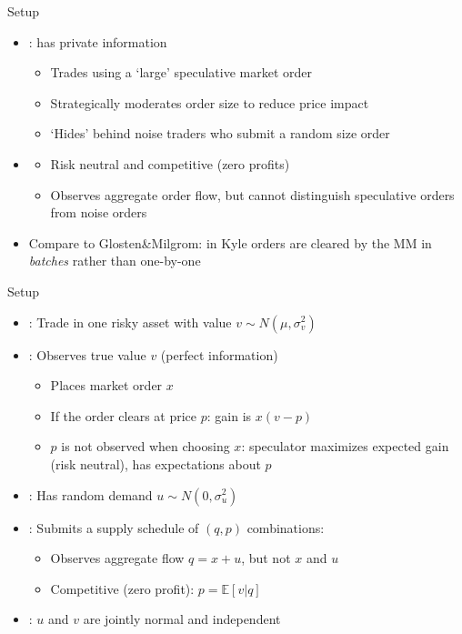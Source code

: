 \documentclass[english,10pt
,aspectratio=169
]{beamer}
\begin{document}
\begin{frame}{Setup}
	\begin{itemize}
		\item {}: has private information
		\begin{itemize}
			\item Trades using a `large' speculative market order
			\item Strategically moderates order size to reduce price impact
			\item `Hides' behind noise traders who submit a random size order
		\end{itemize}
		\item {}
		\begin{itemize}
			\item Risk neutral and competitive (zero profits)
			\item Observes aggregate order flow, but cannot distinguish speculative orders from noise orders
		\end{itemize}
		\item Compare to Glosten\&Milgrom: in Kyle orders are cleared by the MM in \textit{batches} rather than one-by-one
	\end{itemize}
\end{frame}


\begin{frame}{Setup}
\begin{itemize}
	\item {}: Trade in one risky asset with value  $v \sim N(\mu, \sigma^2_v)$
	\item {}: Observes true value $v$ (perfect information)
	\begin{itemize}
		\item Places market order $x$
		\item If the order clears at price $p$: gain is $x(v-p)$
		\item $p$ is \alert{not observed} when choosing $x$: speculator maximizes expected gain (risk neutral), has expectations about $p$
	\end{itemize}
	\item {}: Has random demand $u \sim N(0, \sigma^2_u)$
	\item {}: Submits a supply schedule of $(q,p)$ combinations:
	\begin{itemize}
		\item Observes aggregate flow $q=x+u$, but not $x$ and $u$
		\item Competitive (zero profit): $p = \mathbb{E}[v|q]$
	\end{itemize}
	\item {}: $u$ and $v$ are jointly normal and independent
\end{itemize}
\end{frame}
\end{document}
